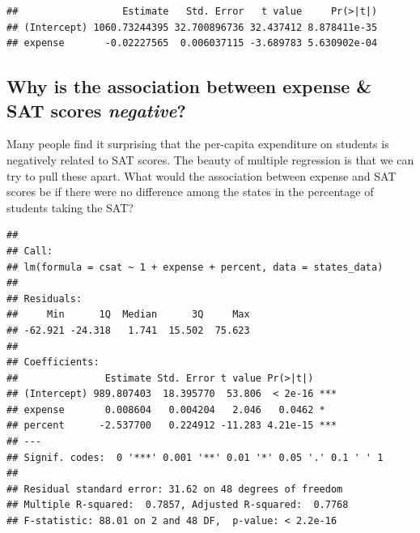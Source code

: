 \documentclass[]{book}
\newenvironment{Shaded}{\begin{snugshade}}{\end{snugshade}}
\newcommand{\DataTypeTok}[1]{\textcolor[rgb]{0.13,0.29,0.53}{#1}}
\newcommand{\DecValTok}[1]{\textcolor[rgb]{0.00,0.00,0.81}{#1}}
\newcommand{\KeywordTok}[1]{\textcolor[rgb]{0.13,0.29,0.53}{\textbf{#1}}}
\newcommand{\NormalTok}[1]{#1}
\newcommand{\OperatorTok}[1]{\textcolor[rgb]{0.81,0.36,0.00}{\textbf{#1}}}
\newcommand{\StringTok}[1]{\textcolor[rgb]{0.31,0.60,0.02}{#1}}
\begin{document}
\begin{verbatim}
##                  Estimate   Std. Error   t value     Pr(>|t|)
## (Intercept) 1060.73244395 32.700896736 32.437412 8.878411e-35
## expense       -0.02227565  0.006037115 -3.689783 5.630902e-04
\end{verbatim}

\hypertarget{why-is-the-association-between-expense-sat-scores-negative}{%
\subsection{\texorpdfstring{Why is the association between expense \& SAT scores \emph{negative}?}{Why is the association between expense \& SAT scores negative?}}\label{why-is-the-association-between-expense-sat-scores-negative}}

Many people find it surprising that the per-capita expenditure on students is negatively related to SAT scores. The beauty of multiple regression is that we can try to pull these apart. What would the association between expense and SAT scores be if there were no difference among the states in the percentage of students taking the SAT?

\begin{Shaded}
\end{Shaded}

\begin{verbatim}
## 
## Call:
## lm(formula = csat ~ 1 + expense + percent, data = states_data)
## 
## Residuals:
##     Min      1Q  Median      3Q     Max 
## -62.921 -24.318   1.741  15.502  75.623 
## 
## Coefficients:
##               Estimate Std. Error t value Pr(>|t|)    
## (Intercept) 989.807403  18.395770  53.806  < 2e-16 ***
## expense       0.008604   0.004204   2.046   0.0462 *  
## percent      -2.537700   0.224912 -11.283 4.21e-15 ***
## ---
## Signif. codes:  0 '***' 0.001 '**' 0.01 '*' 0.05 '.' 0.1 ' ' 1
## 
## Residual standard error: 31.62 on 48 degrees of freedom
## Multiple R-squared:  0.7857, Adjusted R-squared:  0.7768 
## F-statistic: 88.01 on 2 and 48 DF,  p-value: < 2.2e-16
\end{verbatim}
\end{document}
